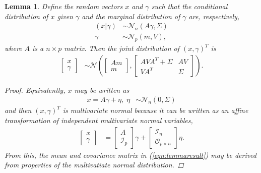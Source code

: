 \documentclass[11pt]{article}
\newtheorem{lemma}[theorem]{Lemma}
\newcommand{\pN}{\mathcal{N}}
\newcommand{\1}{\mathbf{1}}
\newcommand{\0}{\mathbf{0}}
\begin{document}
\begin{lemma}\label{lem:joint}
	Define the random vectors $x$ and $\gamma$ such that the conditional distribution of $x$ given $\gamma$ and the marginal distribution of $\gamma$ are, respectively,
	\begin{align*}
		(x | \gamma) &\sim \pN_n(A\gamma, \Sigma) \\
		\gamma &\sim \pN_p(m, V),
	\end{align*}
	where $A$ is a $n \times p$ matrix. Then the joint distribution of $(x, \gamma)^T$ is 
	\begin{align}
		\begin{bmatrix}
			x \\
			\gamma
		\end{bmatrix} &\sim \pN \left( \begin{bmatrix}
			Am \\
			m
		\end{bmatrix}, \begin{bmatrix}
			AVA^T + \Sigma & AV \\
			VA^T & \Sigma
		\end{bmatrix} \right). \label{eqn:lemmaresult}
	\end{align}
	\begin{proof}
		Equivalently, $x$ may be written as  
		\begin{align*}
			x = A\gamma + \eta,\; \eta &\sim \pN_n(0, \Sigma) 
		\end{align*}
		and then $(x, \gamma)^T$ is multivariate normal because it can be written as an affine transformation of independent multivariate normal variables,
		\begin{align*}
			\begin{bmatrix}
				x \\
				\gamma
			\end{bmatrix} &= \begin{bmatrix}
				A \\ 
				\mathcal{I}_p
			\end{bmatrix} \gamma + \begin{bmatrix}
				\mathcal{I}_n \\
				\mathcal{O}_{p \times n}
			\end{bmatrix} \eta. 
		\end{align*}
		From this, the mean and covariance matrix in (\ref{eqn:lemmaresult}) may be derived from properties of the multivatiate normal distribution.
	\end{proof}
\end{lemma} 
\end{document}
